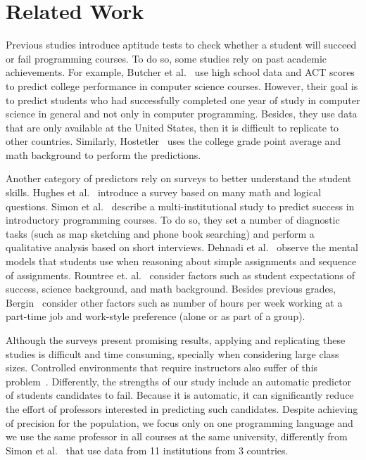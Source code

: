 \section{Related Work}

\label{sec:related}

Previous studies introduce aptitude tests to check whether a student will succeed or fail programming courses. To do so, some studies rely on past academic achievements. For example, Butcher et al.~\cite{butcher-predictor-high-school-1985} use high school data and ACT scores to predict college performance in computer science courses. However, their goal is to predict students who had successfully completed one year of study in computer science in general and not only in computer programming. Besides, they use data that are only available at the United States, then it is difficult to replicate to other countries. Similarly, Hostetler~\cite{hostetler-aptitude-1983} uses the college grade point average and math background to perform the predictions.

Another category of predictors rely on surveys to better understand the student skills. Hughes et al.~\cite{ibm-aptitude-test} introduce a survey based on many math and logical questions. Simon et al.~\cite{simon-predictors-ace2006} describe a multi-institutional study to predict success in introductory programming courses. To do so, they set a number of diagnostic tasks (such as map sketching and phone book searching) and perform a qualitative analysis based on short interviews. Dehnadi et al.~\cite{camel-2006} observe the mental models that students use when reasoning about simple assignments and sequence of assignments. Rountree et. al.~\cite{nathan-2004} consider factors such as student expectations of success, science background, and math background. Besides previous grades, Bergin~\cite{susan-sigce2005} consider other factors such as number of hours per week working at a part-time job and work-style preference (alone or as part of a group).

Although the surveys present promising results, applying and replicating these studies is difficult and time consuming, specially when considering large class sizes. Controlled environments that require instructors also suffer of this problem~\cite{barker-predictor-83}. Differently, the strengths of our study include an automatic predictor of students candidates to fail. Because it is automatic, it can significantly reduce the effort of professors interested in predicting such candidates. Despite achieving \higherPrecision of precision for the population, we focus only on one programming language and we use the same professor in all \semesters courses at the same university, differently from Simon et al.~\cite{simon-predictors-ace2006} that use data from 11 institutions from 3 countries.

